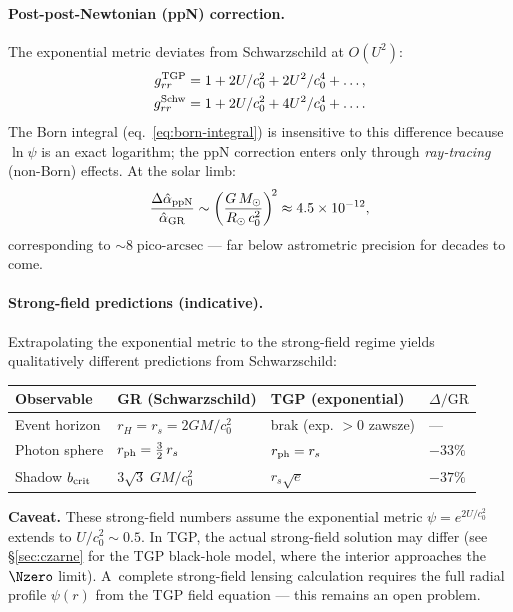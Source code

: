 \paragraph{Post-post-Newtonian (ppN) correction.}
The exponential metric deviates from Schwarzschild at $O(U^2)$:
\begin{align}
  g_{rr}^{\rm TGP}  &= 1 + 2U/c_0^2 + 2U^2/c_0^4 + \ldots,
  \nonumber\\
  g_{rr}^{\rm Schw} &= 1 + 2U/c_0^2 + 4U^2/c_0^4 + \ldots.
  \label{eq:ppN-grr}
\end{align}
The Born integral (eq.~\ref{eq:born-integral}) is insensitive to
this difference because $\ln\psi$ is an exact logarithm;
the ppN correction enters only through \emph{ray-tracing}
(non-Born) effects. At the solar limb:
\begin{equation}\label{eq:ppN-estimate}
  \frac{\Delta\hat\alpha_{\rm ppN}}{\hat\alpha_{\rm GR}}
  \sim \left(\frac{G\,M_\odot}{R_\odot\,c_0^2}\right)^{\!2}
  \approx 4.5 \times 10^{-12},
\end{equation}
corresponding to $\sim\!8\;\mathrm{pico\text{-}arcsec}$
--- far below astrometric precision for decades to come.

\paragraph{Strong-field predictions (indicative).}
Extrapolating the exponential metric to the strong-field regime
yields qualitatively different predictions from Schwarzschild:

\begin{center}\small
\begin{tabular}{@{}llll@{}}
\toprule
\textbf{Observable} & \textbf{GR (Schwarzschild)} &
\textbf{TGP (exponential)} & $\Delta/\mathrm{GR}$ \\
\midrule
Event horizon   & $r_H = r_s = 2GM/c_0^2$  & brak (exp. $> 0$ zawsze) & --- \\[2pt]
Photon sphere   & $r_{\rm ph} = \tfrac{3}{2}\,r_s$ & $r_{\rm ph} = r_s$ & $-33\%$ \\[2pt]
Shadow $b_{\rm crit}$ & $3\sqrt{3}\;GM/c_0^2$ & $r_s\sqrt{e}$ & $-37\%$ \\
\bottomrule
\end{tabular}
\end{center}

\noindent
\textbf{Caveat.}
These strong-field numbers assume the exponential metric
$\psi = e^{2U/c_0^2}$ extends to $U/c_0^2 \sim 0.5$.
In TGP, the actual strong-field solution may differ
(see \S\ref{sec:czarne} for the TGP black-hole model,
where the interior approaches the $\Nzero$ limit).
A~complete strong-field lensing calculation requires the
full radial profile $\psi(r)$ from the TGP field equation
--- this remains an open problem.

